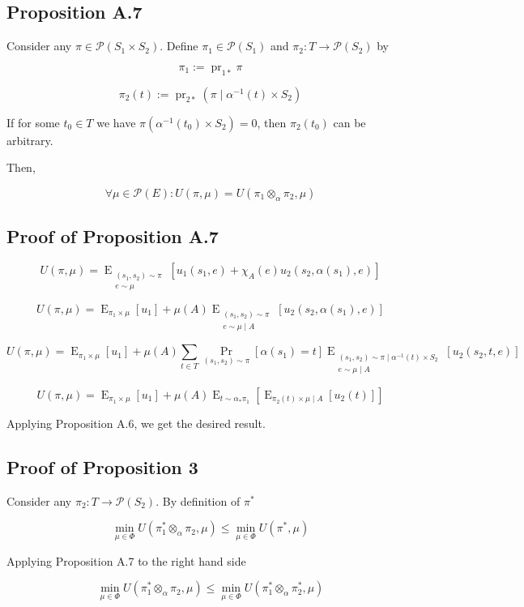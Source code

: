\documentclass[a4paper]{article}
\DeclareMathOperator{\Prb}{Pr}
\DeclareMathOperator{\E}{E}
\newcommand{\EE}[2]{\operatorname{E}_{\substack{#1 \\ #2}}}
\DeclareMathOperator{\Prj}{pr}
\newcommand{\Prob}{\mathcal{P}}
\begin{document}
\subsection{Proposition A.7}

Consider any ${\pi \in \Prob(S_1 \times S_2)}$. Define ${\pi_1 \in \Prob(S_1)}$ and ${\pi_2: T \rightarrow \Prob(S_2)}$ by

$$\pi_1 := \Prj_{1*}\pi$$

$$\pi_2(t) := \Prj_{2*} (\pi \mid \alpha^{-1}(t) \times S_2)$$

If for some ${t_0 \in T}$ we have ${\pi(\alpha^{-1}(t_0) \times S_2)=0}$, then ${\pi_2(t_0)}$ can be arbitrary.

Then,

$$\forall \mu \in \Prob(E):U(\pi,\mu)=U(\pi_1 \otimes_\alpha \pi_2, \mu)$$

\subsection{Proof of Proposition A.7}

$$U(\pi, \mu) = \EE{(s_1,s_2) \sim \pi}{e \sim \mu}[u_1(s_1,e) + \chi_A(e) u_2(s_2, \alpha(s_1), e)]$$

$$U(\pi, \mu) = \E_{\pi_1 \times \mu}[u_1] + \mu(A) \EE{(s_1,s_2) \sim \pi}{e \sim \mu \mid A}[u_2(s_2, \alpha(s_1), e)]$$

$$U(\pi, \mu) = \E_{\pi_1 \times \mu}[u_1] + \mu(A) \sum_{t \in T} \Prb_{(s_1, s_2) \sim \pi}[\alpha(s_1)=t] \EE{(s_1,s_2) \sim \pi \mid \alpha^{-1}(t) \times S_2}{e \sim \mu \mid A}[u_2(s_2, t, e)]$$

$$U(\pi, \mu) = \E_{\pi_1 \times \mu}[u_1] + \mu(A) \E_{t \sim \alpha_*\pi_1}[\E_{\pi_2(t) \times \mu \mid A}[u_2(t)]]$$

Applying Proposition A.6, we get the desired result.

\subsection{Proof of Proposition 3}

Consider any ${\pi_2: T \rightarrow \Prob(S_2)}$. By definition of ${\pi^*}$ 

$${\min_{\mu \in \Phi} U(\pi_1^* \otimes_\alpha \pi_2, \mu) \leq \min_{\mu \in \Phi} U(\pi^*, \mu)}$$

Applying Proposition A.7 to the right hand side

$${\min_{\mu \in \Phi} U(\pi_1^* \otimes_\alpha \pi_2, \mu) \leq \min_{\mu \in \Phi} U(\pi_1^* \otimes_\alpha \pi_2^*, \mu)}$$
\end{document}
